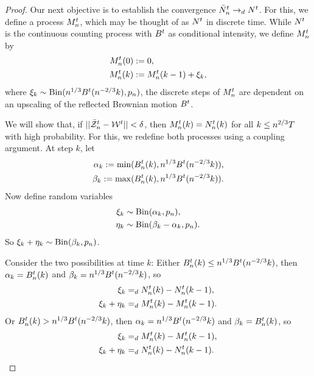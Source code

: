 \begin{proof}
Our next objective is to establish the convergence $\bar{N}_n^t \rightarrow_d N^t$.
For this, we define a process $M_n^t$, which may be thought of as $N^t$ in discrete time.
While $N^t$ is the continuous counting process with $B^t$ as conditional intensity,
we define $M_n^t$ by
\begin{equation}
\begin{aligned}
M_n^t(0) &:= 0, \\
M_n^t(k) &:= M_n^t(k-1) + \xi_k, 
\end{aligned}
\end{equation}
where $\xi_k \sim \operatorname*{Bin}(n^{1 / 3}B^t(n^{-2 / 3}k), p_n)$,
the discrete steps of $M_n^t$ are dependent on an upscaling of the reflected Brownian motion $B^t$.

We will show that, if $||\bar{\mathcal{Z}}^t_n - \mathcal{W}^t|| < \delta$, 
then $M_n^t(k) = N_n^t(k)$ for all $k \leq n^{2 / 3}T$ with high probability.
For this, we redefine both processes using a coupling argument.
At step $k$, let
\begin{equation} \label{E: def alpha beta}
\begin{aligned}
\alpha_k := \min(B_n^t(k), n^{1 / 3}B^t(n^{-2 / 3}k)), \\
\beta_k := \max(B_n^t(k), n^{1 / 3}B^t(n^{-2 / 3}k)).
\end{aligned}
\end{equation}
Now define random variables
\begin{equation} \label{E: def xi eta}
\begin{aligned}
\xi_k &\sim \operatorname*{Bin}(\alpha_k, p_n), \\
\eta_k &\sim \operatorname*{Bin}(\beta_k - \alpha_k, p_n).
\end{aligned}
\end{equation}
So $\xi_k + \eta_k \sim \operatorname*{Bin}(\beta_k, p_n)$.

Consider the two possibilities at time $k$:
Either $B_n^t(k) \leq n^{1 / 3}B^t(n^{-2 / 3}k)$,
then $\alpha_k = B_n^t(k)$ and $\beta_k = n^{1 / 3}B^t(n^{-2 / 3}k)$, 
so 
\begin{equation}
\begin{aligned}
\xi_k &=_d N_n^t(k) - N_n^t(k-1), \\
\xi_k + \eta_k &=_d M_n^t(k) - M_n^t(k-1).
\end{aligned}
\end{equation}
Or $B_n^t(k) > n^{1 / 3}B^t(n^{-2 / 3}k)$,
then $\alpha_k = n^{1 / 3}B^t(n^{-2 / 3}k)$ and $\beta_k = B_n^t(k)$, 
so
\begin{equation}
\begin{aligned}
\xi_k &=_d M_n^t(k) - M_n^t(k-1), \\
\xi_k + \eta_k &=_d N_n^t(k) - N_n^t(k-1).
\end{aligned}
\end{equation}


\end{proof}
